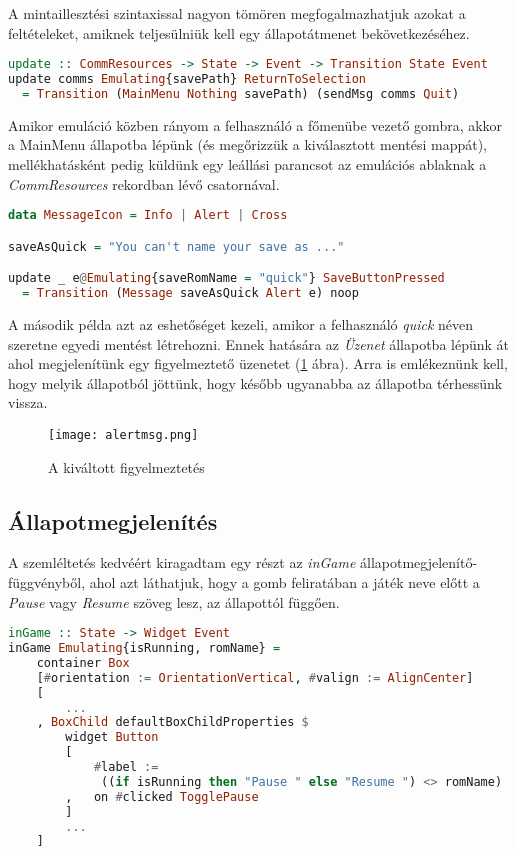 A mintaillesztési szintaxissal nagyon tömören megfogalmazhatjuk azokat a feltételeket, amiknek teljesülniük kell egy állapotátmenet bekövetkezéséhez.
\vspace{0.2cm}
\begin{lstlisting}[language=Haskell, basicstyle=\scriptsize]
update :: CommResources -> State -> Event -> Transition State Event
update comms Emulating{savePath} ReturnToSelection 
  = Transition (MainMenu Nothing savePath) (sendMsg comms Quit)
\end{lstlisting}
\vspace{0.2cm}
Amikor emuláció közben rányom a felhasználó a főmenübe vezető gombra, akkor a MainMenu állapotba lépünk (és megőrizzük a kiválasztott mentési mappát), mellékhatásként pedig küldünk egy leállási parancsot az emulációs ablaknak a \emph{CommResources} rekordban lévő csatornával. 
\vspace{0.2cm}
\begin{lstlisting}[language=Haskell, basicstyle=\scriptsize]
data MessageIcon = Info | Alert | Cross

saveAsQuick = "You can't name your save as ..."

update _ e@Emulating{saveRomName = "quick"} SaveButtonPressed 
  = Transition (Message saveAsQuick Alert e) noop
\end{lstlisting}

A második példa azt az eshetőséget kezeli, amikor a felhasználó \emph{quick} néven szeretne egyedi mentést létrehozni. Ennek hatására az \emph{Üzenet} állapotba lépünk át ahol megjelenítünk egy figyelmeztető üzenetet (\ref{fig:warning} ábra). Arra is emlékeznünk kell, hogy melyik állapotból jöttünk, hogy később ugyanabba az állapotba térhessünk vissza. 

\begin{figure}[H]
	\centering
	\texttt{[image: alertmsg.png]}
	\caption{A kiváltott figyelmeztetés\protect\footnotemark}
	\label{fig:warning}
\end{figure}

\subsection{Állapotmegjelenítés}

A szemléltetés kedvéért kiragadtam egy részt az \emph{inGame} állapotmegjelenítő-függvényből, ahol azt láthatjuk, hogy a gomb feliratában a játék neve előtt a \emph{Pause} vagy \emph{Resume} szöveg lesz, az állapottól függően.
\vspace{0.2cm}
\begin{lstlisting}[language=Haskell, basicstyle=\scriptsize]
inGame :: State -> Widget Event
inGame Emulating{isRunning, romName} = 
	container Box
	[#orientation := OrientationVertical, #valign := AlignCenter]
	[
		...
	, BoxChild defaultBoxChildProperties $ 
		widget Button
		[ 
			#label :=
			 ((if isRunning then "Pause " else "Resume ") <> romName)
		,	on #clicked TogglePause
		]
		...
	]
	
\end{lstlisting}

